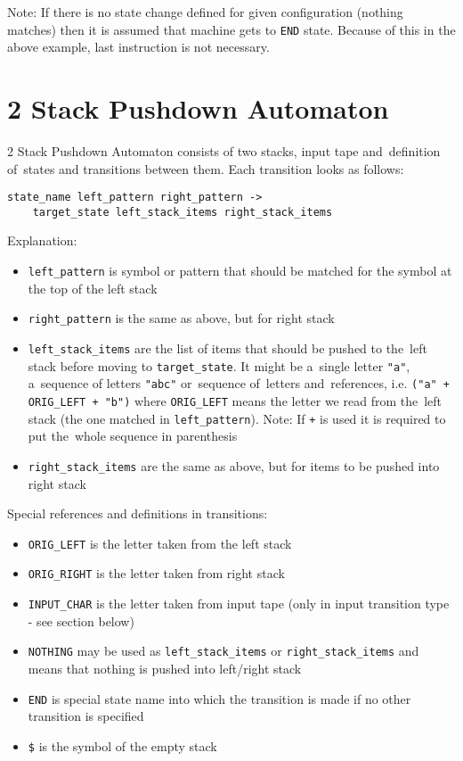 \documentclass[english,shortabstract,mgr]{iithesis}
\begin{document}
Note: If there is no state change defined for given configuration
(nothing matches) then it is assumed that machine gets to \texttt{END} state.
Because of this in the above example, last instruction is not necessary.

\section {2 Stack Pushdown Automaton}

2 Stack Pushdown Automaton consists of two stacks, input tape and~definition
of~states and transitions between them. Each transition looks as follows:
\begin{verbatim}
state_name left_pattern right_pattern ->
    target_state left_stack_items right_stack_items
\end{verbatim}

Explanation:
\begin{itemize}
  \item \texttt{left\_pattern} is symbol or pattern that should be matched
      for the symbol at the top of the left stack
  \item \texttt{right\_pattern} is the same as above, but for right stack
  \item \texttt{left\_stack\_items} are the list of items that should be pushed
      to the~left stack before moving to \texttt{target\_state}. It might be
      a~single letter \texttt{"a"}, a~sequence of letters \texttt{"abc"}
      or~sequence of~letters and~references, i.e. \texttt{("a" + ORIG\_LEFT + "b")}
      where \texttt{ORIG\_LEFT} means the letter we read from the~left stack (the one matched
      in \texttt{left\_pattern}). Note: If \texttt{+} is used it is required to put
      the~whole sequence in parenthesis
  \item \texttt{right\_stack\_items} are the same as above, but for items to be pushed into right stack
\end{itemize}

Special references and definitions in transitions:
\begin{itemize}
  \item \texttt{ORIG\_LEFT} is the letter taken from the left stack
  \item \texttt{ORIG\_RIGHT} is the letter taken from right stack
  \item \texttt{INPUT\_CHAR} is the letter taken from input tape
      (only in input transition type - see section below)
  \item \texttt{NOTHING} may be used as \texttt{left\_stack\_items} or \texttt{right\_stack\_items}
      and means that nothing is pushed into left/right stack
  \item \texttt{END} is special state name into which the transition is made if no other transition is specified
  \item \texttt{\$} is the symbol of the empty stack
\end{itemize}
\end{document}
